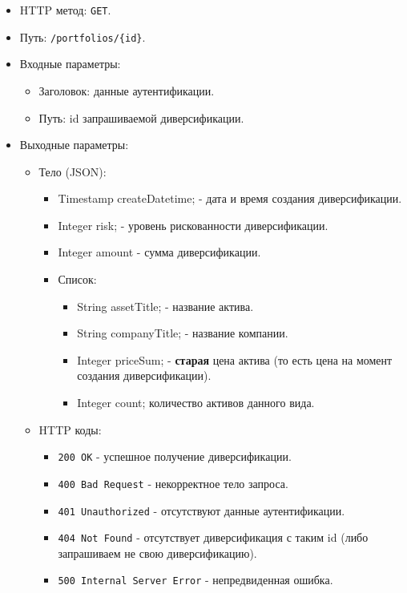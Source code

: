 \documentclass[a4paper, 14pt]{article}
\begin{document}
\begin{itemize}
    \item HTTP метод: \texttt{GET}.
    \item Путь: \texttt{/portfolios/\{id\}}.
    \item Входные параметры:
    \begin{itemize}
        \item Заголовок: данные аутентификации.
        \item Путь: id запрашиваемой диверсификации.
    \end{itemize}
    \item Выходные параметры:
    \begin{itemize}
        \item Тело (JSON):
        \begin{itemize}
            \item Timestamp createDatetime; - дата и время создания диверсификации.
            \item Integer risk; - уровень рискованности диверсификации.
            \item Integer amount - сумма диверсификации.
            \item Список:
            \begin{itemize}
                \item String assetTitle; - название актива.
                \item String companyTitle; - название компании.
                \item Integer priceSum; - \textbf{старая} цена актива (то есть цена на момент создания диверсификации).
                \item Integer count; количество активов данного вида.
            \end{itemize}
        \end{itemize}
        \item HTTP коды:
        \begin{itemize}
            \item \texttt{200 OK} - успешное получение диверсификации.
            \item \texttt{400 Bad Request} - некорректное тело запроса.
            \item \texttt{401 Unauthorized} - отсутствуют данные аутентификации.
            \item \texttt{404 Not Found} - отсутствует диверсификация с таким id (либо запрашиваем не свою диверсификацию).
            \item \texttt{500 Internal Server Error} - непредвиденная ошибка.
        \end{itemize}
    \end{itemize}
\end{itemize}
\end{document}
